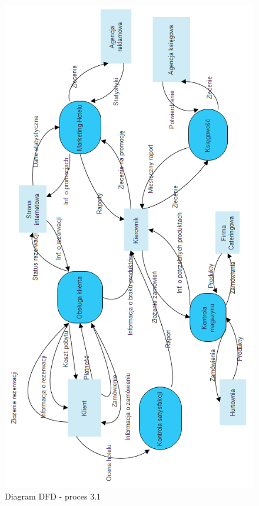 \documentclass[a4paper, 11pt]{article}
\begin{document}
	\begin{figure}[H]%
			\center
			\includegraphics[scale=0.7]{Img/DFDpoziom0.png}
			\caption{Diagram DFD - proces 3.1}
	\end{figure}
	
		
\end{document}
